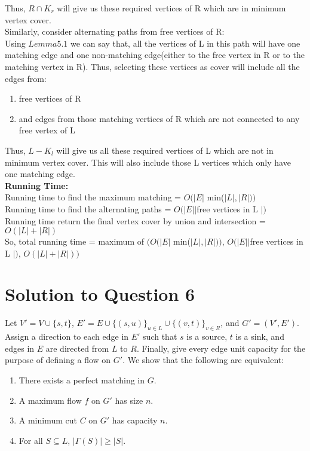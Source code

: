 \documentclass[11pt]{article}
\begin{document}
Thus, $R \cap K_r$ will give us these required vertices of R which are in minimum vertex cover. \\
Similarly, consider alternating paths from free vertices of R: \\
Using $Lemma 5.1$ we can say that, all the vertices of L in this path will have one matching edge and one non-matching edge(either to 
the free vertex in R or to the matching vertex in R). Thus, selecting these vertices as cover will include all the edges from: \\
\begin{enumerate}
	\item free vertices of R
	\item and edges from those matching vertices of R which are not connected to any free vertex of L
\end{enumerate}
Thus, $L - K_l$ will give us all these required vertices of L which are not in minimum vertex cover. This  will also include those L 
vertices which only have one matching edge. \\
\textbf{Running Time:} \\
Running time to find the maximum matching = $O(|E|$ min($|L|, |R|))$ \\
Running time to find the alternating paths = $O(|E| |$free vertices in L $|)$ \\
Running time return the final vertex cover by union and intersection = $O(|L|+|R|)$ \\
So, total running time = maximum of $(O(|E|$ min($|L|, |R|))$, $O(|E| |$free vertices in L $|)$, $O(|L|+|R|))$

\newpage
\section{Solution to Question 6}

Let $V' = V \cup \{s, t\}$, $E' = E \cup \{(s, u)\}_{u \in L} \cup \{(v, t)\}_{v \in R}$, and $G' = {(V', E')}$.
Assign a direction to each edge in $E'$ such that $s$ is a source, $t$ is a sink, and edges in $E$ are directed from $L$ to $R$.
Finally, give every edge unit capacity for the purpose of defining a flow on $G'$.
We show that the following are equivalent:

\begin{enumerate}
  \item There exists a perfect matching in $G$.
  \item A maximum flow $f$ on $G'$ has size $n$.
  \item A minimum cut $C$ on $G'$ has capacity $n$.
  \item For all $S \subseteq L$, $|\Gamma(S)| \geq |S|$.
\end{enumerate}
\end{document}

